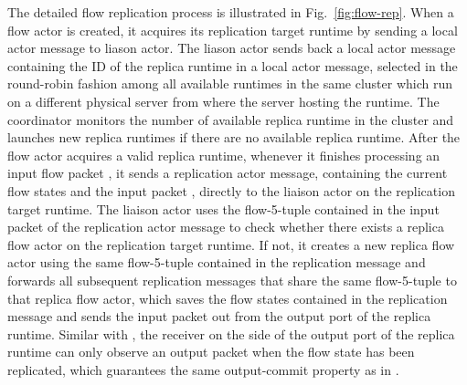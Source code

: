 The detailed flow replication process is illustrated in Fig.~\ref{fig:flow-rep}. When a flow actor is created, it acquires its replication target runtime by sending a local actor message to liason actor.  %
The liason actor sends back a local actor message containing the ID
of the replica runtime in a local actor message, selected in the round-robin fashion among all available runtimes in the same cluster which run on a different physical server from where the server hosting the runtime. %
The coordinator monitors the number of available replica runtime in the cluster and launches new replica runtimes if there are no available replica runtime.  After the flow actor acquires a valid replica runtime, whenever it finishes processing an input flow packet %
, it sends a replication actor message, containing the current flow states and the input packet %
, directly to the liaison actor on the replication target runtime. The liaison actor uses the flow-5-tuple contained in the input packet of the replication actor message to check whether there exists a replica flow actor on the replication target runtime. If not, it creates a new replica flow actor using the same flow-5-tuple contained in the replication message and forwards all subsequent replication messages that share the same flow-5-tuple to that replica flow actor, which saves the flow states contained in the replication message and sends the input packet out from the output port of the replica runtime.
Similar with \cite{sherry2015rollback}, the receiver on the side of the output port of the replica runtime can only observe an output packet when the flow state has been replicated, which guarantees the same output-commit property as in \cite{sherry2015rollback}. %
